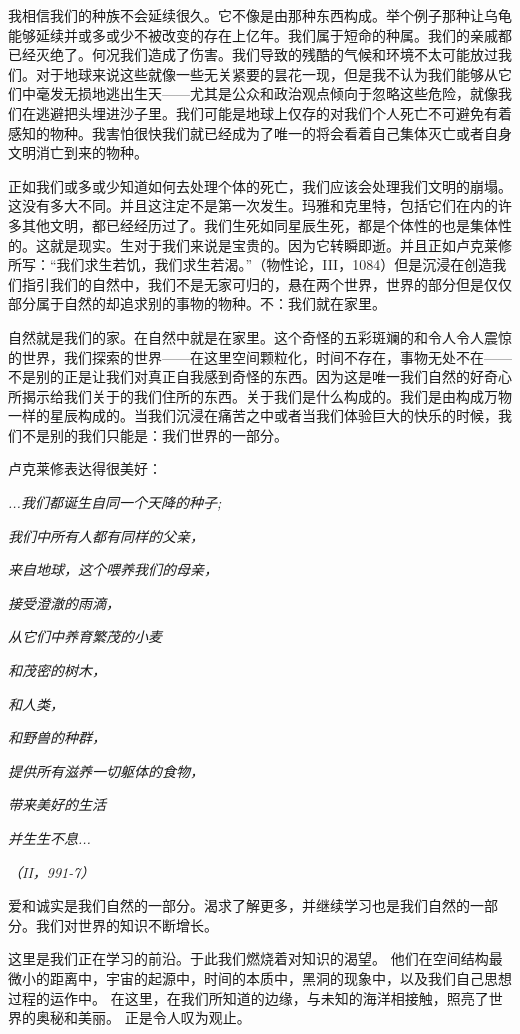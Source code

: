    我相信我们的种族不会延续很久。它不像是由那种东西构成。举个例子那种让乌龟能够延续并或多或少不被改变的存在上亿年。我们属于短命的种属。我们的亲戚都已经灭绝了。何况我们造成了伤害。我们导致的残酷的气候和环境不太可能放过我们。对于地球来说这些就像一些无关紧要的昙花一现，但是我不认为我们能够从它们中毫发无损地逃出生天——尤其是公众和政治观点倾向于忽略这些危险，就像我们在逃避把头埋进沙子里。我们可能是地球上仅存的对我们个人死亡不可避免有着感知的物种。我害怕很快我们就已经成为了唯一的将会看着自己集体灭亡或者自身文明消亡到来的物种。

   正如我们或多或少知道如何去处理个体的死亡，我们应该会处理我们文明的崩塌。这没有多大不同。并且这注定不是第一次发生。玛雅和克里特，包括它们在内的许多其他文明，都已经经历过了。我们生死如同星辰生死，都是个体性的也是集体性的。这就是现实。生对于我们来说是宝贵的。因为它转瞬即逝。并且正如卢克莱修所写：“我们求生若饥，我们求生若渴。”（物性论，III，1084）但是沉浸在创造我们指引我们的自然中，我们不是无家可归的，悬在两个世界，世界的部分但是仅仅部分属于自然的却追求别的事物的物种。不：我们就在家里。

   自然就是我们的家。在自然中就是在家里。这个奇怪的五彩斑斓的和令人令人震惊的世界，我们探索的世界——在这里空间颗粒化，时间不存在，事物无处不在——不是别的正是让我们对真正自我感到奇怪的东西。因为这是唯一我们自然的好奇心所揭示给我们关于的我们住所的东西。关于我们是什么构成的。我们是由构成万物一样的星辰构成的。当我们沉浸在痛苦之中或者当我们体验巨大的快乐的时候，我们不是别的我们只能是：我们世界的一部分。

   卢克莱修表达得很美好：

 \emph{...我们都诞生自同一个天降的种子;}

 \emph{我们中所有人都有同样的父亲，}

 \emph{来自地球，这个喂养我们的母亲，}

 \emph{接受澄澈的雨滴，}

 \emph{从它们中养育繁茂的小麦}

 \emph{和茂密的树木，}

 \emph{和人类，}

 \emph{和野兽的种群，}

 \emph{提供所有滋养一切躯体的食物，}

 \emph{带来美好的生活}

 \emph{并生生不息...}

 \emph{（II，991-7）}



   爱和诚实是我们自然的一部分。渴求了解更多，并继续学习也是我们自然的一部分。我们对世界的知识不断增长。

   这里是我们正在学习的前沿。于此我们燃烧着对知识的渴望。 他们在空间结构最微小的距离中，宇宙的起源中，时间的本质中，黑洞的现象中，以及我们自己思想过程的运作中。 在这里，在我们所知道的边缘，与未知的海洋相接触，照亮了世界的奥秘和美丽。 正是令人叹为观止。


\noindent
